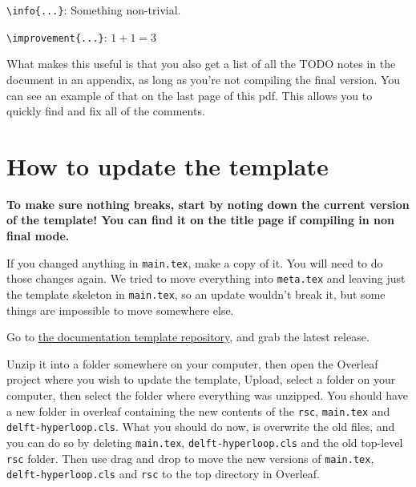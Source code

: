 \vspace{5em}

\verb|\info{...}|: Something non-trivial. 

\vspace{5em}

\verb|\improvement{...}|: $1+1=3$

\vspace{5em}

What makes this useful is that you also get a list of all the TODO notes in the document in an appendix, as long as you're not compiling the final version. You can see an example of that on the last page of this pdf. This allows you to quickly find and fix all of the comments.

\newpage

\section*{How to update the template} \label{sec:how-to-update-template}

\textbf{\color{red} To make sure nothing breaks, start by noting down the current version of the template! You can find it on the title page if compiling in non final mode.}

{\color{bloodred} If you changed anything in \verb|main.tex|, make a copy of it. You will need to do those changes again. We tried to move everything into \verb|meta.tex| and leaving just the template skeleton in \verb|main.tex|, so an update wouldn't break it, but some things are impossible to move somewhere else.}

Go to \href{https://github.com/delft-hyperloop/DH09-Documentation-Template/releases}{\color{HyperloopGreen} the documentation template repository}, and grab the latest release.

Unzip it into a folder somewhere on your computer, then open the Overleaf project where you wish to update the template, Upload, select a folder on your computer, then select the folder where everything was unzipped. You should have a new folder in overleaf containing the new contents of the \verb|rsc|, \verb|main.tex| and \verb|delft-hyperloop.cls|. What you should do now, is overwrite the old files, and you can do so by deleting \verb|main.tex|, \verb|delft-hyperloop.cls| and the old top-level \verb|rsc| folder. Then use drag and drop to move the new versions of \verb|main.tex|, \verb|delft-hyperloop.cls| and \verb|rsc| to the top directory in Overleaf.

